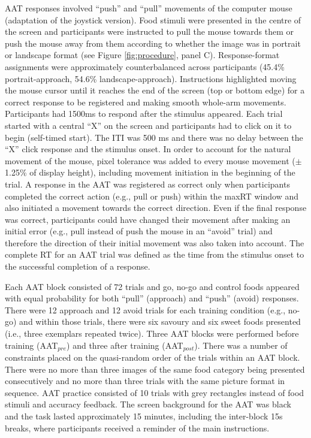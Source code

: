 \documentclass[man,floatsintext]{apa6}
\begin{document}
AAT responses involved \enquote{push} and \enquote{pull} movements of
the computer mouse (adaptation of the joystick version). Food stimuli
were presented in the centre of the screen and participants were
instructed to pull the mouse towards them or push the mouse away from
them according to whether the image was in portrait or landscape format
(see Figure \ref{fig:procedure}, panel C). Response-format assignments
were approximately counterbalanced across participants (45.4\%
portrait-approach, 54.6\% landscape-approach). Instructions highlighted
moving the mouse cursor until it reaches the end of the screen (top or
bottom edge) for a correct response to be registered and making smooth
whole-arm movements. Participants had 1500ms to respond after the
stimulus appeared. Each trial started with a central \enquote{X} on the
screen and participants had to click on it to begin (self-timed start).
The ITI was 500 ms and there was no delay between the \enquote{X} click
response and the stimulus onset. In order to account for the natural
movement of the mouse, pixel tolerance was added to every mouse movement
(\(\pm\) 1.25\% of display height), including movement initiation in the
beginning of the trial. A response in the AAT was registered as correct
only when participants completed the correct action (e.g., pull or push)
within the maxRT window and also initiated a movement towards the
correct direction. Even if the final response was correct, participants
could have changed their movement after making an initial error (e.g.,
pull instead of push the mouse in an \enquote{avoid} trial) and
therefore the direction of their initial movement was also taken into
account. The complete RT for an AAT trial was defined as the time from
the stimulus onset to the successful completion of a response.

\par

Each AAT block consisted of 72 trials and go, no-go and control foods
appeared with equal probability for both \enquote{pull} (approach) and
\enquote{push} (avoid) responses. There were 12 approach and 12 avoid
trials for each training condition (e.g., no-go) and within those
trials, there were six savoury and six sweet foods presented (i.e.,
three exemplars repeated twice). Three AAT blocks were performed before
training (AAT\(_{pre}\)) and three after training (AAT\(_{post}\)).
There was a number of constraints placed on the quasi-random order of
the trials within an AAT block. There were no more than three images of
the same food category being presented consecutively and no more than
three trials with the same picture format in sequence. AAT practice
consisted of 10 trials with grey rectangles instead of food stimuli and
accuracy feedback. The screen background for the AAT was black and the
task lasted approximately 15 minutes, including the inter-block 15s
breaks, where participants received a reminder of the main instructions.
\end{document}

